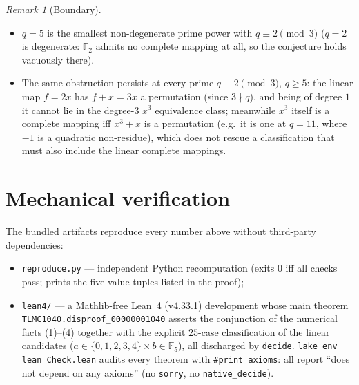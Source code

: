 \documentclass[11pt]{article}
\newcommand{\F}{\mathbb{F}}
\theoremstyle{plain}
\theoremstyle{remark}
\newtheorem{remark}{Remark}
\begin{document}
\begin{remark}[Boundary]
\begin{itemize}
\item $q = 5$ is the smallest non-degenerate prime power with
$q \equiv 2 \pmod 3$ ($q = 2$ is degenerate: $\F_2$ admits no complete
mapping at all, so the conjecture holds vacuously there).
\item The same obstruction persists at every prime $q \equiv 2 \pmod 3$,
$q \geq 5$: the linear map $f = 2x$ has $f + x = 3x$ a permutation
(since $3 \nmid q$), and being of degree $1$ it cannot lie in the
degree-$3$ $x^3$ equivalence class; meanwhile $x^3$ itself is a complete
mapping iff $x^3 + x$ is a permutation (e.g.\ it is one at $q = 11$, where
$-1$ is a quadratic non-residue), which does not rescue a classification
that must also include the linear complete mappings.
\end{itemize}
\end{remark}

\section*{Mechanical verification}

The bundled artifacts reproduce every number above without third-party
dependencies:
\begin{itemize}
\item \texttt{reproduce.py} --- independent Python recomputation (exits $0$
iff all checks pass; prints the five value-tuples listed in the proof);
\item \texttt{lean4/} --- a Mathlib-free Lean~4 (v4.33.1) development whose
main theorem \texttt{TLMC1040.disproof\_00000001040} asserts the
conjunction of the numerical facts (1)--(4) together with the explicit
$25$-case classification of the linear candidates
($a \in \{0,1,2,3,4\} \times b \in \F_5$), all discharged by
\texttt{decide}. \texttt{lake env lean Check.lean} audits every theorem
with \texttt{\#print axioms}: all report ``does not depend on any
axioms'' (no \texttt{sorry}, no \texttt{native\_decide}).
\end{itemize}
\end{document}

